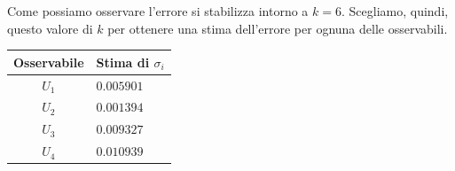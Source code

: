 \documentclass[a4paper,10pt]{article}
\begin{document}
\medskip
\noindent Come possiamo osservare l'errore si stabilizza intorno a $k=6$. Scegliamo, quindi, questo valore di $k$ per ottenere una stima dell'errore per ognuna delle osservabili.
\medskip 
\begin{table}[H]
	\centering
	\begin{tabular}{cl} 
	\hline
	Osservabile      &	Stima di $\sigma _{i}$  \\
	\hline
	$U_1$      & $0.005901$  \\
	$U_2$      & $0.001394$  \\
	$U_3$      & $0.009327$  \\
	$U_4$      & $0.010939$  \\
	\hline
	\end{tabular}
\end{table}
\newpage
\end{document}
